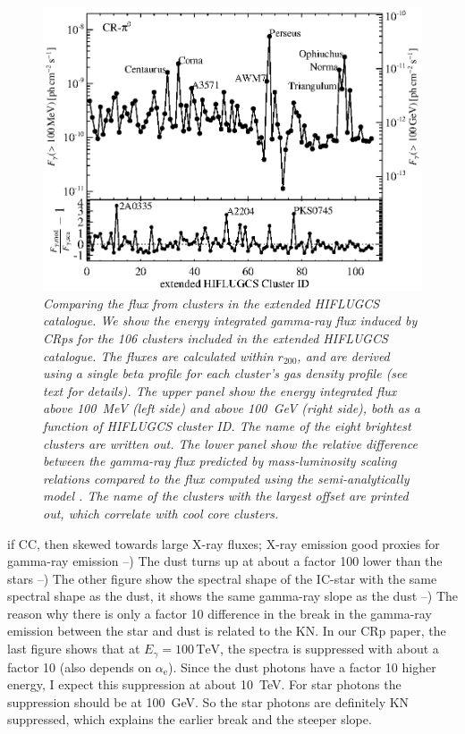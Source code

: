\documentclass[10pt,aps,pra,reprint,amsmath,amsfonts,amssymb,showpacs]{revtex4-1}
\newcommand{\rmn}{\mathrm}
\newcommand{\tev}{\rmn{TeV}}
\newcommand{\rvir}{r_{200}}
\newcommand{\e}{\rmn{e}}
\newcommand{\eg}{E_\gamma}
\begin{document}
\begin{figure}%
\begin{minipage}{2.0\columnwidth}
 \includegraphics[width=0.99\columnwidth]{figures/Flux.comp.CR.eps}
\caption{\it Comparing the flux from clusters in the extended HIFLUGCS
  catalogue. We show the energy integrated gamma-ray flux induced by
  CRps for the 106 clusters included in the extended HIFLUGCS
  catalogue. The fluxes are calculated within $\rvir$, and are derived
  using a single beta profile for each cluster's gas density profile
  (see text for details). The upper panel show the energy integrated
  flux above 100~MeV (left side) and above 100~GeV (right side), both
  as a function of HIFLUGCS cluster ID. The name of the eight
  brightest clusters are written out. The lower panel show the
  relative difference between the gamma-ray flux predicted by
  mass-luminosity scaling relations compared to the flux computed
  using the semi-analytically model \cite{2010MNRAS.409..449P}. The
  name of the clusters with the largest offset are printed out, which
  correlate with cool core clusters.}
 \label{fig19}
\end{minipage}
\end{figure}
if CC, then skewed towards large X-ray fluxes; X-ray emission good
proxies for gamma-ray emission --) The dust turns up at about a factor
100 lower than the stars --) The other figure show the spectral shape
of the IC-star with the same spectral shape as the dust, it shows the
same gamma-ray slope as the dust --) The reason why there is only a
factor 10 difference in the break in the gamma-ray emission between
the star and dust is related to the KN. In our CRp paper, the last
figure shows that at $\eg=100\,\tev$, the spectra is suppressed with
about a factor 10 (also depends on $\alpha_\e$). Since the dust
photons have a factor 10 higher energy, I expect this suppression at
about 10~TeV. For star photons the suppression should be at
100~GeV. So the star photons are definitely KN suppressed, which
explains the earlier break and the steeper slope.
\end{document}

